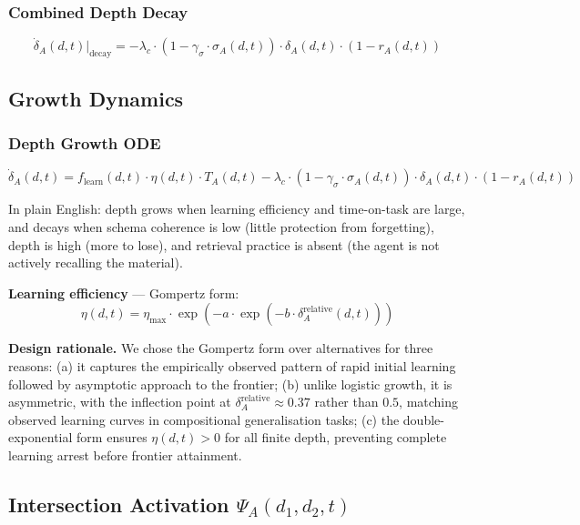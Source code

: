 \documentclass[11pt,a4paper]{article}
\begin{document}
\subsubsection{Combined Depth Decay}
\begin{equation}\label{eq:depth-decay}
\dot{\delta}_A(d,t)\big|_{\text{decay}} = -\lambda_c \cdot (1 - \gamma_\sigma \cdot \sigma_A(d,t)) \cdot \delta_A(d,t) \cdot (1 - r_A(d,t))
\end{equation}

\subsection{Growth Dynamics}\label{sec:growth}

\subsubsection{Depth Growth ODE}
\begin{equation}\label{eq:depth-ode}
\dot{\delta}_A(d,t) = f_{\text{learn}}(d,t) \cdot \eta(d,t) \cdot T_A(d,t) - \lambda_c \cdot (1 - \gamma_\sigma \cdot \sigma_A(d,t)) \cdot \delta_A(d,t) \cdot (1 - r_A(d,t))
\end{equation}

In plain English: depth grows when learning efficiency and time-on-task are large, and decays when schema coherence is low (little protection from forgetting), depth is high (more to lose), and retrieval practice is absent (the agent is not actively recalling the material).

\textbf{Learning efficiency} --- Gompertz form:
\begin{equation}\label{eq:gompertz}
\eta(d,t) = \eta_{\text{max}} \cdot \exp(-a \cdot \exp(-b \cdot \delta_A^{\text{relative}}(d,t)))
\end{equation}

\textbf{Design rationale.} We chose the Gompertz form over alternatives
for three reasons: (a) it captures the empirically observed pattern of
rapid initial learning followed by asymptotic approach to the frontier;
(b) unlike logistic growth, it is asymmetric, with the inflection point
at $\delta_A^{\text{relative}} \approx 0.37$ rather than $0.5$, matching
observed learning curves in compositional generalisation tasks; (c) the
double-exponential form ensures $\eta(d,t) > 0$ for all finite depth,
preventing complete learning arrest before frontier attainment.

\subsection{Intersection Activation \texorpdfstring{$\Psi_A(d_1,d_2,t)$}{Psi\_A(d\_1,d\_2,t)}}\label{sec:intersection}
\end{document}
